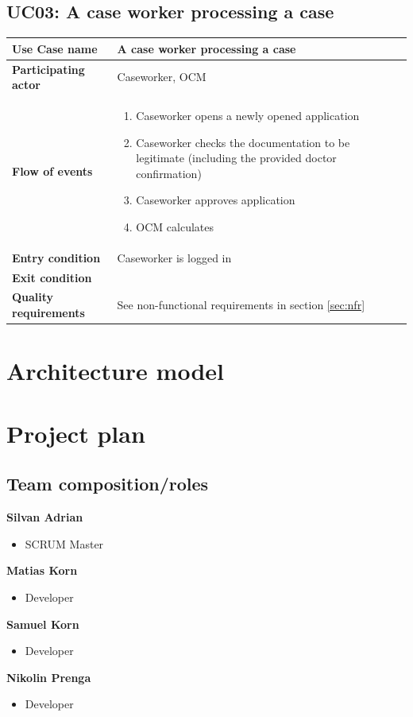 \documentclass{article}
\begin{document}
\subsection{UC03: A case worker processing a case}
\begin{table}[htb!]
\begin{tabularx}{\textwidth}{l|X}
	\textbf{Use Case name} & A case worker processing a case \\
	\hline
	\textbf{Participating actor} & Caseworker, OCM\\
	\hline
	\textbf{Flow of events} & 
	\begin{minipage}{\linewidth}
	    \begin{enumerate}
	        \item Caseworker opens a newly opened application
	        \item Caseworker checks the documentation to be legitimate (including the provided doctor confirmation)
	        \item Caseworker approves application
	        \item OCM calculates 
	    \end{enumerate}
	\end{minipage}\\
	\hline
	\textbf{Entry condition} & Caseworker is logged in\\
	\hline
	\textbf{Exit condition} & \\
	\hline
	\textbf{Quality requirements} & See non-functional requirements in section \ref{sec:nfr}\\
\end{tabularx}
\end{table}

\newpage
\section{Architecture model}

\newpage
\section{Project plan}

\subsection{Team composition/roles}
\textbf{Silvan Adrian}
\begin{itemize}
	\item SCRUM Master %
\end{itemize}
\textbf{Matias Korn}
\begin{itemize}
	\item Developer
\end{itemize}
\textbf{Samuel Korn}
\begin{itemize}
	\item Developer
\end{itemize}
\textbf{Nikolin Prenga}
\begin{itemize}
	\item Developer
\end{itemize}
\end{document}
